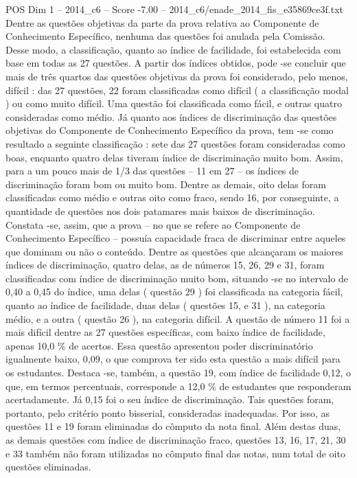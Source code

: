\begin{textsample}{POS Dim 1 – 2014\_c6 – Score -7.00 – 2014\_c6/enade\_2014\_fis\_e35869ce3f.txt}
Dentre as questões objetivas da parte da prova relativa ao Componente de Conhecimento Específico, nenhuma das questões foi anulada pela Comissão.
Desse modo, a classificação, quanto ao índice de facilidade, foi estabelecida com base em todas as 27 questões.
A partir dos índices obtidos, pode -se concluir que mais de três quartos das questões objetivas da prova foi considerado, pelo menos, difícil : das 27 questões, 22 foram classificadas como difícil ( a classificação modal ) ou como muito difícil.
Uma questão foi classificada como fácil, e outras quatro consideradas como médio.
Já quanto aos índices de discriminação das questões objetivas do Componente de Conhecimento Específico da prova, tem -se como resultado a seguinte classificação : sete das 27 questões foram consideradas como boas, enquanto quatro delas tiveram índice de discriminação muito bom.
Assim, para a um pouco mais de 1/3 das questões – 11 em 27 – os índices de discriminação foram bom ou muito bom.
Dentre as demais, oito delas foram classificadas como médio e outras oito como fraco, sendo 16, por conseguinte, a quantidade de questões nos dois patamares mais baixos de discriminação.
Constata -se, assim, que a prova – no que se refere ao Componente de Conhecimento Específico – possuía capacidade fraca de discriminar entre aqueles que dominam ou não o conteúdo.
Dentre as questões que alcançaram os maiores índices de discriminação, quatro delas, as de números 15, 26, 29 e 31, foram classificadas com índice de discriminação muito bom, situando -se no intervalo de 0,40 a 0,45 do índice, uma delas ( questão 29 ) foi classificada na categoria fácil, quanto ao índice de facilidade, duas delas ( questões 15, e 31 ), na categoria médio, e a outra ( questão 26 ), na categoria difícil.
A questão de número 11 foi a mais difícil dentre as 27 questões específicas, com baixo índice de facilidade, apenas 10,0 \% de acertos.
Essa questão apresentou poder discriminatório igualmente baixo, 0,09, o que comprova ter sido esta questão a mais difícil para os estudantes.
Destaca -se, também, a questão 19, com índice de facilidade 0,12, o que, em termos percentuais, corresponde a 12,0 \% de estudantes que responderam acertadamente.
Já 0,15 foi o seu índice de discriminação.
Tais questões foram, portanto, pelo critério ponto bisserial, consideradas inadequadas.
Por isso, as questões 11 e 19 foram eliminadas do cômputo da nota final.
Além destas duas, as demais questões com índice de discriminação fraco, questões 13, 16, 17, 21, 30 e 33 também não foram utilizadas no cômputo final das notas, num total de oito questões eliminadas.

\end{textsample}
